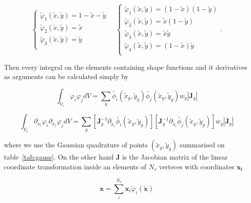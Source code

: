 \documentclass[review]{elsarticle}
\begin{document}
\begin{equation}
\left\{
\begin{array}{ll}
\tilde{\varphi}_1(\tilde{x},\tilde{y}) = 1 - \tilde{x} - \tilde{y}\\
\tilde{\varphi}_2(\tilde{x},\tilde{y}) = \tilde{x}\\
\tilde{\varphi}_3(\tilde{x},\tilde{y}) = \tilde{y}\\
\end{array}
\right.
\quad
\left\{
\begin{array}{ll}
\tilde{\varphi}_1(\tilde{x},\tilde{y}) = (1 - \tilde{x})(1 - \tilde{y})\\
\tilde{\varphi}_2(\tilde{x},\tilde{y}) = \tilde{x}(1 - \tilde{y})\\
\tilde{\varphi}_3(\tilde{x},\tilde{y}) = \tilde{x}\tilde{y}\\
\tilde{\varphi}_4(\tilde{x},\tilde{y}) = (1 - \tilde{x})\tilde{y}\\
\end{array}
\right.
.
\end{equation}

Then every integral on the elements containing shape functions and it derivatives as arguments
can be calculated simply by

\begin{equation}
\int_{V_{e}} \varphi_i \varphi_j dV = \sum_{g}
\tilde{\phi_i}(\tilde{x}_g,\tilde{y}_g) 
\tilde{\phi_j}(\tilde{x}_g,\tilde{y}_g) 
w_g |\bm{J}_g|
\end{equation}

\begin{equation}
\int_{V_{e}} \partial_{x_i}\varphi_i \partial_{x_j}\varphi_j dV = \sum_{g}
\left[
\bm{J}_g^{-1}\partial_{\tilde{x}_i}\tilde{\phi_i}(\tilde{x}_g,\tilde{y}_g)
\right]
\left[
\bm{J}_g^{-1}\partial_{\tilde{x}_i}\tilde{\phi_j}(\tilde{x}_g,\tilde{y}_g) 
\right]
w_g |\bm{J}_g|
\end{equation}

where we use the Gaussian quadrature of points $(\tilde{x}_g,\tilde{y}_g)$
summarised on table~\ref{tab:gauss}. On the other hand $\bm{J}$ is the
Jacobian matrix of the linear coordinate transformation inside an elements of
$N_v$ verteces with coordinates $\bm{x_i}$

\begin{equation}
\bm{x} =
\sum_{i}^{N_{v}} \bm{x}_i \tilde{\varphi}_i (\tilde{\bm{x}})
\end{equation}
\end{document}
